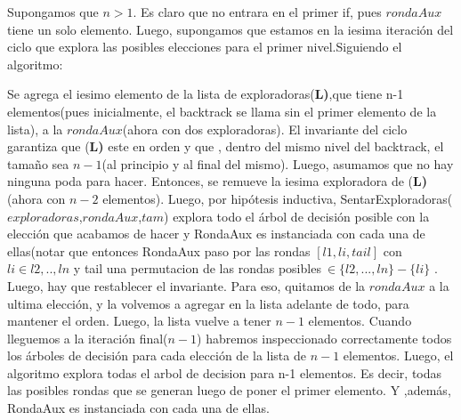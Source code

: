 \documentclass[10pt, a4paper]{article}
\begin{document}
Supongamos que $n> 1$.  Es claro que no entrara en el primer if, pues $rondaAux$ tiene un solo elemento. Luego, supongamos que estamos en la iesima iteración del ciclo que explora las posibles elecciones para el primer nivel.Siguiendo el algoritmo: 

Se agrega el iesimo elemento de la lista de exploradoras(\textbf{L)},que tiene n-1 elementos(pues inicialmente, el backtrack se llama  sin el primer elemento de la lista), a la $rondaAux$(ahora con dos exploradoras). El invariante del ciclo garantiza que  (\textbf{L)} este en orden y que , dentro del mismo nivel del backtrack, el tamaño sea $n-1$(al principio y al final del mismo). Luego, asumamos que no hay ninguna poda para hacer. Entonces, se remueve la iesima exploradora de (\textbf{L)}(ahora con $n-2$ elementos). Luego, por hipótesis inductiva, SentarExploradoras($exploradoras$,$rondaAux$,$tam$) explora todo el árbol de decisión posible con la elección que acabamos de hacer y RondaAux es instanciada con cada una de ellas(notar que entonces RondaAux paso por las rondas $[l1,li,tail]$ con $li \in {l2,..,ln}$ y tail una permutacion de las rondas posibles$ \ \in \{l2,...,ln\} - \{li\}$ . 
Luego, hay que restablecer el invariante. Para eso, quitamos de la $rondaAux$ a la ultima elección, y la volvemos a agregar en la lista adelante de todo, para mantener el orden. Luego, la lista vuelve a tener $n-1$ elementos. Cuando lleguemos a la iteración final($n-1$) habremos inspeccionado correctamente todos los árboles de decisión para cada elección de la lista de $n-1$ elementos. Luego, el algoritmo explora todas el arbol de decision para n-1 elementos. Es decir, todas las posibles rondas que se generan luego de poner el primer elemento. Y ,además, RondaAux es instanciada con cada una de ellas.
\end{document}
